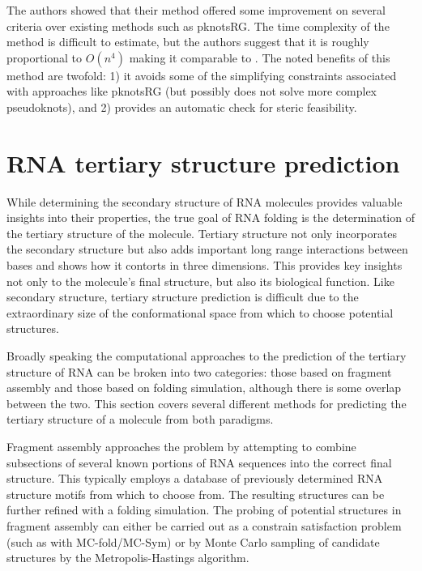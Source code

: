 \documentclass[journal]{IEEEtran}
\begin{document}
The authors showed that their method offered some improvement on several criteria over existing methods such as pknotsRG. The time complexity of the method is difficult to estimate, but the authors suggest that it is roughly proportional to $O(n^4)$ making it comparable to \cite{reeder2007pknotsrg}. The noted benefits of this method are twofold: 1) it avoids some of the simplifying constraints associated with approaches like pknotsRG (but possibly does not solve more complex pseudoknots), and 2) provides an automatic check for steric feasibility.



\section{RNA tertiary structure prediction}
\label{sec:rna-tertiary-structure}
While determining the secondary structure of RNA molecules provides valuable insights into their properties, the true goal of RNA folding is the determination of the tertiary structure of the molecule. Tertiary structure not only incorporates the secondary structure but also adds important long range interactions between bases and shows how it contorts in three dimensions. This provides key insights not only to the molecule's final structure, but also its biological function. Like secondary structure, tertiary structure prediction is difficult due to the extraordinary size of the conformational space from which to choose potential structures. 

Broadly speaking the computational approaches to the prediction of the tertiary structure of RNA can be broken into two categories: those based on fragment assembly and those based on folding simulation, although there is some overlap between the two. This section covers several different methods for predicting the tertiary structure of a molecule from both paradigms.

Fragment assembly approaches the problem by attempting to combine subsections of several known portions of RNA sequences into the correct final structure. This typically employs a database of previously determined RNA structure motifs from which to choose from. The resulting structures can be further refined with a folding simulation. The probing of potential structures in fragment assembly can either be carried out as a constrain satisfaction problem (such as with MC-fold/MC-Sym\cite{parisien2008mc}) or by Monte Carlo sampling of candidate structures by the Metropolis-Hastings algorithm. 
\end{document}
